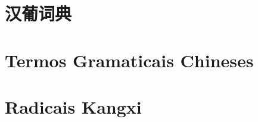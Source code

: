 \documentclass[a4paper,9pt,twoside,openany]{memoir}
\begin{document}


\clearpage
\pagestyle{empty}
\tableofcontents

\clearpage
\pagestyle{empty}
\chapter{汉葡词典}

%
%
%

\clearpage
\pagestyle{dicionario}
\begin{multicols}{2}























\end{multicols}

\clearpage
\pagestyle{plain}
\chapter{Termos Gramaticais Chineses}


\clearpage
\pagestyle{plain}
\chapter{Radicais Kangxi}


\printindex[stroke]
\printindex[radical]
\printindex[pinyin]
\end{document}
